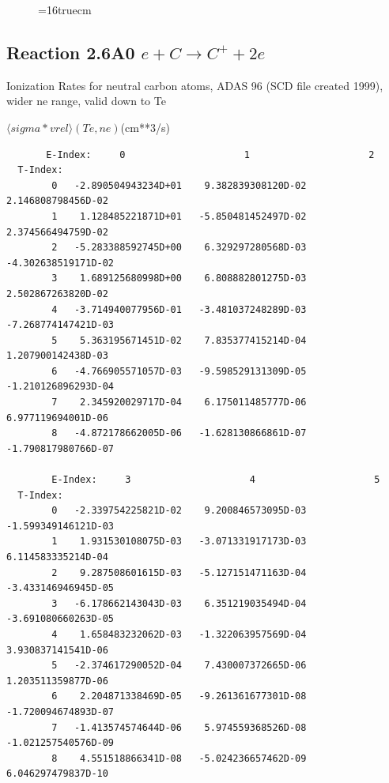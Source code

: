 \documentclass[12pt,dvipdfmx]{article}
\begin{document}
\begin{figure} \label{2.6A0old}
\epsfxsize=16truecm
\end{figure}
\newpage

\subsection{
Reaction 2.6A0 $e + C \rightarrow C^+  + 2e $
}
  Ionization Rates for neutral carbon atoms,
  ADAS 96 (SCD file created 1999), wider ne range, valid down to Te

$  \langle sigma*vrel \rangle(Te,ne) $(cm**3/s)
\begin{small}\begin{verbatim}
       E-Index:     0                     1                     2
  T-Index:
        0   -2.890504943234D+01    9.382839308120D-02    2.146808798456D-02
        1    1.128485221871D+01   -5.850481452497D-02    2.374566494759D-02
        2   -5.283388592745D+00    6.329297280568D-03   -4.302638519171D-02
        3    1.689125680998D+00    6.808882801275D-03    2.502867263820D-02
        4   -3.714940077956D-01   -3.481037248289D-03   -7.268774147421D-03
        5    5.363195671451D-02    7.835377415214D-04    1.207900142438D-03
        6   -4.766905571057D-03   -9.598529131309D-05   -1.210126896293D-04
        7    2.345920029717D-04    6.175011485777D-06    6.977119694001D-06
        8   -4.872178662005D-06   -1.628130866861D-07   -1.790817980766D-07

        E-Index:     3                     4                     5
  T-Index:
        0   -2.339754225821D-02    9.200846573095D-03   -1.599349146121D-03
        1    1.931530108075D-03   -3.071331917173D-03    6.114583335214D-04
        2    9.287508601615D-03   -5.127151471163D-04   -3.433146946945D-05
        3   -6.178662143043D-03    6.351219035494D-04   -3.691080660263D-05
        4    1.658483232062D-03   -1.322063957569D-04    3.930837141541D-06
        5   -2.374617290052D-04    7.430007372665D-06    1.203511359877D-06
        6    2.204871338469D-05   -9.261361677301D-08   -1.720094674893D-07
        7   -1.413574574644D-06    5.974559368526D-08   -1.021257540576D-09
        8    4.551518866341D-08   -5.024236657462D-09    6.046297479837D-10


\end{verbatim}
\end{small}
\end{document}
